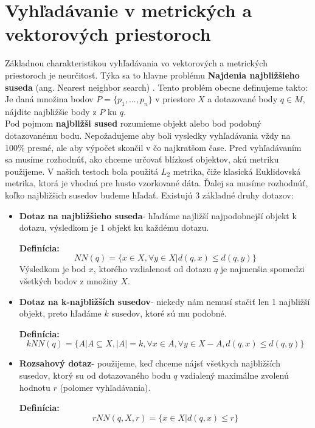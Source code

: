 \documentclass[12pt,oneside]{fithesis2}
\begin{document}
   \section{Vyhľadávanie v metrických a vektorových priestoroch}
   Základnou charakteristikou vyhľadávania vo vektorových a metrických priestoroch je neurčitosť. Týka sa to hlavne problému \textbf{Najdenia najbližšieho suseda} (ang. Nearest neighbor search) \cite{nns2009}. Tento problém obecne definujeme takto: \\
   Je daná množina bodov $P=\{p_1,...,p_n\}$ v priestore $X$ a dotazované body $q \in M$, nájdite najbližšie body z $P$ ku $q$.\\
   Pod pojmom \textbf{najbližši sused} rozumieme objekt alebo bod podobný dotazovanému bodu. Nepožadujeme aby boli vysledky vyhľadávania vždy na 100\% presné, ale aby výpočet skončil v čo najkratšom čase.
   Pred vyhľadávaním sa musíme rozhodnúť, ako chceme určovať blízkosť objektov, akú metriku použijeme. V našich testoch bola použitá $L_2$ metrika, čiže klasická Euklidovská metrika, ktorá je vhodná pre husto vzorkované dáta. Ďalej sa musíme rozhodnúť, koľko najbližšich susedov budeme hľadať. Existujú 3 základné druhy dotazov:
   \begin{itemize}
   \item \textbf{Dotaz na najbližšieho suseda}- hľadáme najližší najpodobnejší objekt k dotazu, výsledkom je 1 objekt ku každému dotazu.
   
   \textbf{Definícia:}
   \begin{equation*}
   NN(q)=\{x \in X, \forall y \in X| d(q,x)\leq d(q,y) \}
   \end{equation*}
Výsledkom je bod $x$, ktorého vzdialenosť od dotazu $q$ je najmenšia spomedzi všetkých bodov z množiny $X$.
   \item \textbf{Dotaz na k-najbližších susedov}- niekedy nám nemusí stačiť len 1 najbližší objekt, preto hľadáme $k$ susedov, ktoré sú mu podobné.
   
   \textbf{Definícia:}
   \begin{equation*}
   kNN(q)=\{A|A \subseteq X,|A|=k,\forall x \in A,\forall y \in X - A,d(q,x)\leq d(q,y)\}
   \end{equation*}    
   \item \textbf{Rozsahový dotaz}- použijeme, keď chceme nájsť všetkych najbližších susedov, ktorý su od dotazovaného bodu $q$ vzdialený maximálne zvolenú hodnotu $r$ (polomer vyhľadávania).
   
   \textbf{Definícia:} %
   \begin{equation*} 
  rNN(q,X,r)=\{ x \in X|d(q,x)\leq r \}
   \end{equation*}  
   \end{itemize}
   
\end{document}
